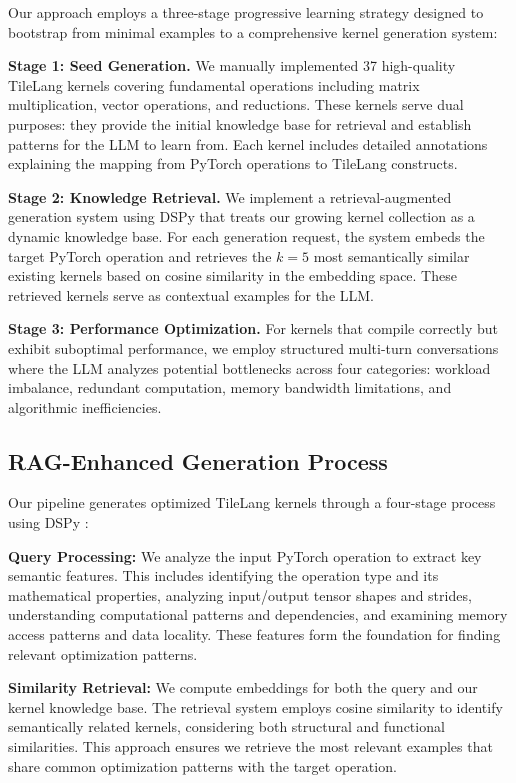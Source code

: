 \documentclass{article}
\begin{document}
Our approach employs a three-stage progressive learning strategy designed to bootstrap from minimal examples to a comprehensive kernel generation system:

\textbf{Stage 1: Seed Generation.} We manually implemented 37 high-quality TileLang kernels covering fundamental operations including matrix multiplication, vector operations, and reductions. These kernels serve dual purposes: they provide the initial knowledge base for retrieval and establish patterns for the LLM to learn from. Each kernel includes detailed annotations explaining the mapping from PyTorch operations to TileLang constructs.

\textbf{Stage 2: Knowledge Retrieval.} We implement a retrieval-augmented generation system using DSPy \cite{dspy2023} that treats our growing kernel collection as a dynamic knowledge base. For each generation request, the system embeds the target PyTorch operation and retrieves the $k=5$ most semantically similar existing kernels based on cosine similarity in the embedding space. These retrieved kernels serve as contextual examples for the LLM.

\textbf{Stage 3: Performance Optimization.} For kernels that compile correctly but exhibit suboptimal performance, we employ structured multi-turn conversations where the LLM analyzes potential bottlenecks across four categories: workload imbalance, redundant computation, memory bandwidth limitations, and algorithmic inefficiencies.

\subsection{RAG-Enhanced Generation Process}
Our pipeline generates optimized TileLang kernels through a four-stage process using DSPy \cite{dspy2023}:

\textbf{Query Processing:} We analyze the input PyTorch operation to extract key semantic features. This includes identifying the operation type and its mathematical properties, analyzing input/output tensor shapes and strides, understanding computational patterns and dependencies, and examining memory access patterns and data locality. These features form the foundation for finding relevant optimization patterns.

\textbf{Similarity Retrieval:} We compute embeddings for both the query and our kernel knowledge base. The retrieval system employs cosine similarity to identify semantically related kernels, considering both structural and functional similarities. This approach ensures we retrieve the most relevant examples that share common optimization patterns with the target operation.
\end{document}
